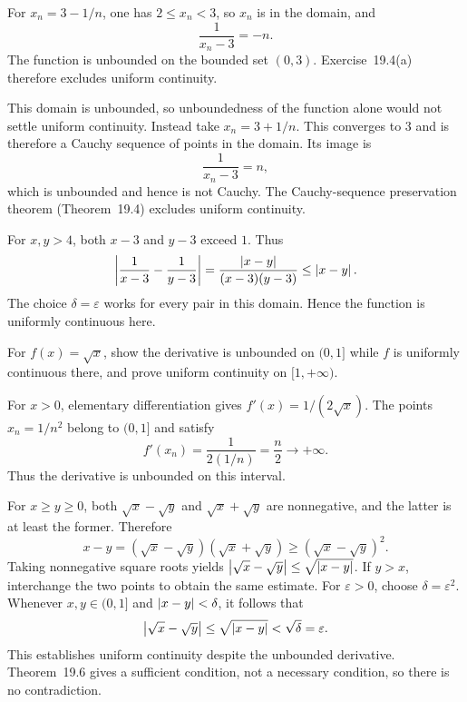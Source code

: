 For $x_n=3-1/n$, one has $2\le x_n<3$, so $x_n$ is in
the domain, and
\[
 \frac1{x_n-3}=-n.
\]
The function is unbounded on the bounded set $(0,3)$.
Exercise~19.4(a) therefore excludes uniform continuity.

This domain is unbounded, so unboundedness of the function alone
would not settle uniform continuity. Instead take
$x_n=3+1/n$. This converges to $3$ and is therefore a Cauchy
sequence of points in the domain. Its image is
\[
 \frac1{x_n-3}=n,
\]
which is unbounded and hence is not Cauchy. The Cauchy-sequence
preservation theorem (Theorem~19.4) excludes uniform continuity.

For $x,y>4$, both $x-3$ and $y-3$ exceed $1$.
Thus
\[
 \left|\frac1{x-3}-\frac1{y-3}\right|
 =\frac{\left|x-y\right|}{(x-3)(y-3)}\le\left|x-y\right|.
\]
The choice $\delta=\varepsilon$ works for every pair in this
domain. Hence the function is uniformly continuous here.

\goal For $f(x)=\sqrt x$, show the derivative is unbounded on
$(0,1]$ while $f$ is uniformly continuous there, and prove uniform
continuity on $[1,+\infty)$.

For $x>0$, elementary differentiation gives
$f'(x)=1/(2\sqrt x)$. The points $x_n=1/n^2$ belong to
$(0,1]$ and satisfy
\[
 f'(x_n)=\frac{1}{2(1/n)}=\frac n2\longrightarrow+\infty.
\]
Thus the derivative is unbounded on this interval.

For $x\ge y\ge0$, both $\sqrt x-\sqrt y$ and
$\sqrt x+\sqrt y$ are nonnegative, and the latter is at least
the former. Therefore
\[
 x-y=(\sqrt x-\sqrt y)(\sqrt x+\sqrt y)
 \ge(\sqrt x-\sqrt y)^2.
\]
Taking nonnegative square roots yields
$\left|\sqrt x-\sqrt y\right|\le\sqrt{\left|x-y\right|}$.
If $y>x$, interchange the two points to obtain the same estimate.
For $\varepsilon>0$, choose $\delta=\varepsilon^2$.
Whenever $x,y\in(0,1]$ and $\left|x-y\right|<\delta$, it follows that
\[
 \left|\sqrt x-\sqrt y\right|\le\sqrt{\left|x-y\right|}
 <\sqrt\delta=\varepsilon.
\]
This establishes uniform continuity despite the unbounded
derivative. Theorem~19.6 gives a sufficient condition, not a
necessary condition, so there is no contradiction.

